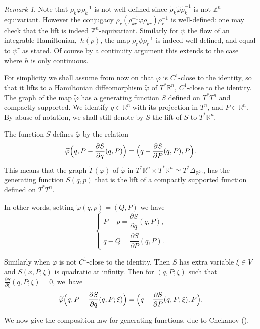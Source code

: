\documentclass[JEP,XML,SOM,NoFloatCountersInSection,Unicode,published]{cedram}
\numberwithin{equation}{section}
\theoremstyle{plain}
\theoremstyle{definition}
\theoremstyle{remark}
\newtheorem{remark}[theorem]{Remark}
\begin{document}
\begin{remark}
Note that $\rho_k\varphi\rho_k^{-1}$ is not well-defined since $\widetilde\rho_k\widetilde\varphi\widetilde\rho_k^{-1}$ is not $ \mathbb Z^n$ equivariant. However the
conjugacy $\rho_r(\rho_{kr}^{-1}\varphi\rho_{kr})\rho_r^{-1}$ is well-defined: one may check that the lift is indeed $ \mathbb Z^n$-equivariant. Similarly for $\psi$ the flow of an integrable \hbox{Hamiltonian},~$h(p)$, the map $\rho_r \psi\rho_r^{-1}$ is indeed well-defined, and equal to $\psi^r$ as stated. Of course by a continuity argument this extends to the case where $h$ is only continuous.
\end{remark}

For simplicity we shall assume from now on that $\varphi$ is $C^{1}$-close to the
identity, so that it lifts to a Hamiltonian diffeomorphism $\widetilde\varphi$ of
$T^{*}\mathbb{R}^{n}$, $C^{1}$-close to the identity. The graph of the map $\widetilde\varphi$ has a generating function
$S$ defined on $T^{*}T^{n}$ and compactly supported. We identify $q \in {\mathbb R}^n$ with its projection in $T^n$, and $P\in {\mathbb R} ^n$. By abuse of notation, we shall still denote by $S$ the lift of $S$ to $T^* {\mathbb R}^n$.

The function $S$ defines
$\widetilde\varphi$ by the relation
\[
\widetilde\varphi \Bigl(q, P-\frac{\partial S}{\partial q} (q,P)\Bigr)
=\Bigl (q- \frac{\partial S}{\partial P} (q,P), P\Bigr).
\]
This means that the graph $\widetilde\Gamma (\varphi)$ of $\widetilde\varphi$ in
$\overline{T^{*} \mathbb{R}^{n} }\times T^{*} \mathbb{R}^{n} \simeq
T^{*} \Delta_{\mathbb{R}^{2n}}$, has the generating function ${S}(q,p)$ that is the lift of a compactly supported function defined on $T^{*}T^{n}$.

In other words, setting $\widetilde \varphi (q,p)=(Q,P)$ we have
\[
\begin{cases} P-p= \dfrac{\partial {S}}{\partial q}
(q,P), \\[10pt] q-Q=\dfrac{\partial {S}}{\partial P}
(q,P).
\end{cases}
\]

Similarly when $\varphi$ is not $C^1$-close to the identity. Then $S$ has extra variable $\xi \in V$ and $S(x,P;\xi)$ is quadratic at infinity. Then for $(q,P;\xi)$ such that $\frac{\partial S}{\partial \xi }(q,P;\xi)=0$, we~have
\[
\widetilde\varphi \Bigl(q, P-\frac{\partial S}{\partial q} (q,P;\xi)\Bigr)
=\Bigl (q- \frac{\partial S}{\partial P} (q,P;\xi), P\Bigr).
\]

We now give the composition law for generating functions, due to Chekanov (\cf \cite{Chekanov}).
\end{document}
